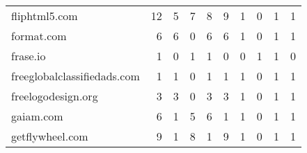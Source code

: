 \begin{tabular}{lrrrrrrrrr}
              fliphtml5.com &                               12 &                                  5 &                                      7 &                            8 &                           9 &                                   1 &                                      0 &                             1 &                            1 \\
                 format.com &                                6 &                                  6 &                                      0 &                            6 &                           6 &                                   1 &                                      0 &                             1 &                            1 \\
                   frase.io &                                1 &                                  0 &                                      1 &                            1 &                           0 &                                   0 &                                      1 &                             1 &                            0 \\
freeglobalclassifiedads.com &                                1 &                                  1 &                                      0 &                            1 &                           1 &                                   1 &                                      0 &                             1 &                            1 \\
         freelogodesign.org &                                3 &                                  3 &                                      0 &                            3 &                           3 &                                   1 &                                      0 &                             1 &                            1 \\
                  gaiam.com &                                6 &                                  1 &                                      5 &                            6 &                           1 &                                   1 &                                      0 &                             1 &                            1 \\
            getflywheel.com &                                9 &                                  1 &                                      8 &                            1 &                           9 &                                   1 &                                      0 &                             1 &                            1 \\

\end{tabular}
